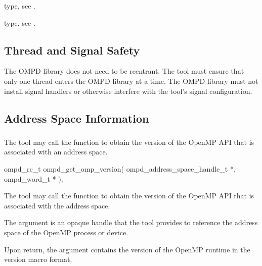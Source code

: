 \begin{crossrefs}
\item {} type, 
see .

\item {} type, see .
\end{crossrefs}



\subsection{Thread and Signal Safety}

The OMPD library does not need to be reentrant. The tool must ensure that only 
one thread enters the OMPD library at a time. The OMPD library must not install 
signal handlers or otherwise interfere with the tool's signal configuration.



\subsection{Address Space Information}

\subsubsection{}
\label{subsubsubsec:ompd_get_omp_version}

\summary
The tool may call the  function to obtain the version 
of the OpenMP API that is associated with an address space.

\format
\begin{cspecific}
\begin{ompSyntax}
ompd_rc_t ompd_get_omp_version(
  ompd_address_space_handle_t *,
  ompd_word_t *
);
\end{ompSyntax}
\end{cspecific}

\descr
The tool may call the  function to obtain the 
version of the OpenMP API that is associated with the address space.

\argdesc
The  argument is an opaque handle that the tool provides
to reference the address space of the OpenMP process or device.

Upon return, the  argument contains the version of the OpenMP 
runtime in the  version macro format.

